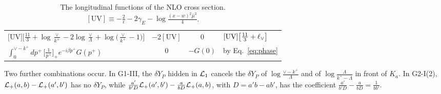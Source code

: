 \begin{table}[!htbp]
\begin{tabular}{p{6.0cm}ccp{6.4cm}}
$\big[\mathrm{UV}\big]\big[\frac{11}{3}+\log\frac{\vee}{k^+}-2\log\frac{\vee}{\Lambda}+\log\big(\frac{\vee}{k^+}-1\big)\big]$ & $-2[\mathrm{UV}]$ & 0 & $[\mathrm{UV}]\big[\frac{11}{3}+\ell_{\vee}\big]$\\
$\int_0^{\vee-k^+}dp^+\,\big[\frac{1}{p^+}\big]_+e^{-i\beta p^+}G(p^+)$ & 0 & $-G(0)$ & by Eq.~\eqref{eq:phase}\\
\bottomrule
\end{tabular}
\caption{The longitudinal functions of the NLO cross section. $[\mathrm{UV}]\equiv-\frac2\epsilon-2\gamma_E-\log\frac{(x-w)^2\bar\mu^2}{4}$.}
\label{tab:L}
\end{table}

Two further combinations occur. In G1-III, the $\delta Y_P$ hidden in $\mathcal{L}_{1}$ cancels the $\delta Y_P$ of $\log\frac{\vee-k^+}{\Lambda}$ and of $\log\frac{\Lambda}{k^+-\Lambda}$ in front of $K_a$. In G2-I(2), $\mathcal{L}_{+}(a,b)-\mathcal{L}_{+}(a',b')$ has no $\delta Y_P$, while $\frac{a'}{b'D}\mathcal{L}_{+}(a',b')-\frac{a}{bD}\mathcal{L}_{+}(a,b)$, with $D=a'b-ab'$, has the coefficient $\frac{a'}{b'D}-\frac{a}{bD}=\frac{1}{bb'}$.
